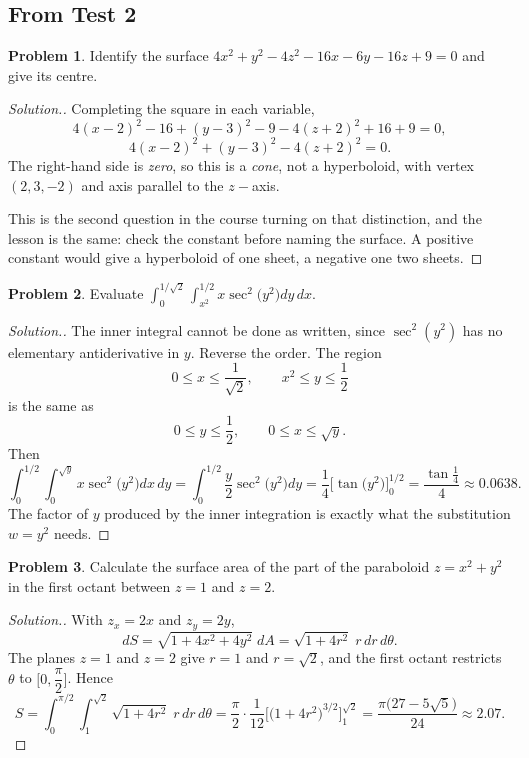 \documentclass[11pt,a4paper]{article}
\theoremstyle{definition}
\newtheorem{problemx}{Problem}[subsection]
\newenvironment{problem}{\begin{problemx}}{\end{problemx}}
\newenvironment{solution}
  {\renewcommand{\qedsymbol}{}\begin{proof}[\textit{Solution}.]}
  {\end{proof}}
\begin{document}
\subsection{From Test 2}

\begin{problem}
Identify the surface $4x^2+y^2-4z^2-16x-6y-16z+9 = 0$ and give its centre.
\end{problem}
\begin{solution}
Completing the square in each variable,
$$4(x-2)^2 - 16 + (y-3)^2 - 9 - 4(z+2)^2 + 16 + 9 = 0 ,$$
$$4(x-2)^2 + (y-3)^2 - 4(z+2)^2 = 0 .$$
The right-hand side is \emph{zero}, so this is a \emph{cone}, not a hyperboloid,
with vertex $(2,3,-2)$ and axis parallel to the $z-$axis.

This is the second question in the course turning on that distinction, and the
lesson is the same: check the constant before naming the surface. A positive
constant would give a hyperboloid of one sheet, a negative one two sheets.
\end{solution}

\begin{problem}
Evaluate
$\displaystyle{\int_0^{1/\sqrt2}\int_{x^2}^{1/2}x\sec^2\big(y^2\big)dy\,dx}$.
\end{problem}
\begin{solution}
The inner integral cannot be done as written, since $\sec^2(y^2)$ has no
elementary antiderivative in $y$. Reverse the order. The region
$$0\leq x\leq\frac{1}{\sqrt2},\qquad x^2\leq y\leq\frac12$$
is the same as
$$0\leq y\leq\frac12,\qquad 0\leq x\leq\sqrt y .$$
Then
$$\int_0^{1/2}\int_0^{\sqrt y}x\sec^2\big(y^2\big)dx\,dy
= \int_0^{1/2}\frac{y}{2}\sec^2\big(y^2\big)dy
= \frac14\Big[\tan\big(y^2\big)\Big]_0^{1/2}
= \frac{\tan\frac14}{4}\approx 0.0638 .$$
The factor of $y$ produced by the inner integration is exactly what the
substitution $w = y^2$ needs.
\end{solution}

\begin{problem}
Calculate the surface area of the part of the paraboloid $z = x^2+y^2$ in the
first octant between $z=1$ and $z=2$.
\end{problem}
\begin{solution}
With $z_x = 2x$ and $z_y = 2y$,
$$dS = \sqrt{1+4x^2+4y^2}\;dA = \sqrt{1+4r^2}\;r\,dr\,d\theta .$$
The planes $z=1$ and $z=2$ give $r=1$ and $r=\sqrt2$, and the first octant
restricts $\theta$ to $\Big[0,\dfrac{\pi}{2}\Big]$. Hence
$$S = \int_0^{\pi/2}\int_1^{\sqrt2}\sqrt{1+4r^2}\;r\,dr\,d\theta
= \frac{\pi}{2}\cdot\frac{1}{12}\Big[\big(1+4r^2\big)^{3/2}\Big]_1^{\sqrt2}
= \frac{\pi\big(27-5\sqrt5\big)}{24}\approx 2.07 .$$
\end{solution}
\end{document}
